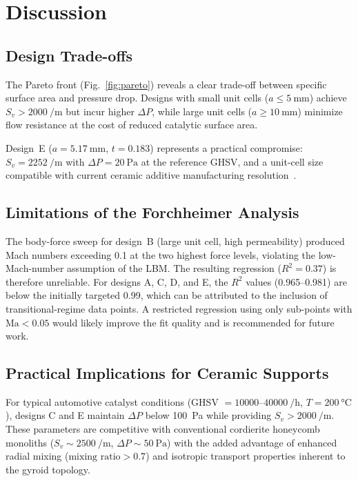 \section{Discussion}\label{sec:discussion}

\subsection{Design Trade-offs}\label{sec:tradeoffs}

The Pareto front (Fig.~\ref{fig:pareto}) reveals a clear trade-off
between specific surface area and pressure drop.
Designs with small unit cells ($a \le \SI{5}{\milli\meter}$) achieve
$S_v > \SI{2000}{\per\meter}$ but incur higher $\Delta P$,
while large unit cells ($a \ge \SI{10}{\milli\meter}$) minimize
flow resistance at the cost of reduced catalytic surface area.

Design~E ($a = \SI{5.17}{\milli\meter}$, $t = 0.183$) represents
a practical compromise: $S_v = \SI{2252}{\per\meter}$ with
$\Delta P = \SI{20}{\pascal}$ at the reference GHSV,
and a unit-cell size compatible with current ceramic
additive manufacturing resolution~\cite{ref_ceramic_am}.

\subsection{Limitations of the Forchheimer Analysis}\label{sec:forch_limits}

The body-force sweep for design~B (large unit cell, high permeability)
produced Mach numbers exceeding 0.1 at the two highest force levels,
violating the low-Mach-number assumption of the LBM.
The resulting regression ($R^2 = 0.37$) is therefore unreliable.
For designs A, C, D, and E, the $R^2$ values (0.965--0.981) are
below the initially targeted 0.99, which can be attributed to the
inclusion of transitional-regime data points.
A restricted regression using only sub-points with $\mathrm{Ma} < 0.05$
would likely improve the fit quality and is recommended for future work.

\subsection{Practical Implications for Ceramic Supports}\label{sec:practical}

For typical automotive catalyst conditions
(GHSV $= \num{10000}$--$\SI{40000}{\per\hour}$, $T = \SI{200}{\celsius}$),
designs C and E maintain $\Delta P$ below \SI{100}{\pascal} while
providing $S_v > \SI{2000}{\per\meter}$.
These parameters are competitive with conventional cordierite
honeycomb monoliths ($S_v \sim \SI{2500}{\per\meter}$,
$\Delta P \sim \SI{50}{\pascal}$) with the added advantage of
enhanced radial mixing ($\text{mixing ratio} > 0.7$)
and isotropic transport properties inherent to the gyroid topology.
